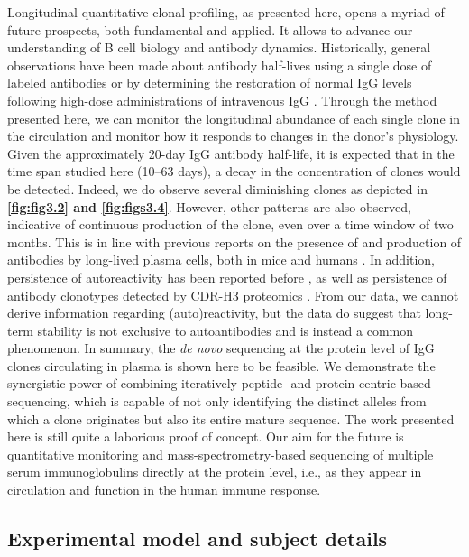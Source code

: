Longitudinal quantitative clonal profiling, as presented here, opens a myriad of future prospects, both fundamental and applied. It allows to advance our understanding of B cell biology and antibody dynamics. Historically, general observations have been made about antibody half-lives using a single dose of labeled antibodies \cite{morell1970metabolic} or by determining the restoration of normal IgG levels following high-dose administrations of intravenous IgG \cite{melamed2018pharmacokinetics}. Through the method presented here, we can monitor the longitudinal abundance of each single clone in the circulation and monitor how it responds to changes in the donor’s physiology. Given the approximately 20-day IgG antibody half-life, it is expected that in the time span studied here (10–63 days), a decay in the concentration of clones would be detected. Indeed, we do observe several diminishing clones as depicted in \textbf{\autoref{fig:fig3.2} and \autoref{fig:figs3.4}}. However, other patterns are also observed, indicative of continuous production of the clone, even over a time window of two months. This is in line with previous reports on the presence of and production of antibodies by long-lived plasma cells, both in mice and humans \cite{bernasconi2002maintenance, manz1997lifetime, slifka1998humoral}. In addition, persistence of autoreactivity has been reported before \cite{tebani2020integration}, as well as persistence of antibody clonotypes detected by CDR-H3 proteomics \cite{lee2019persistent}. From our data, we cannot derive information regarding (auto)reactivity, but the data do suggest that long-term stability is not exclusive to autoantibodies and is instead a common phenomenon.
In summary, the \emph{de novo} sequencing at the protein level of IgG clones circulating in plasma is shown here to be feasible. We demonstrate the synergistic power of combining iteratively peptide- and protein-centric-based sequencing, which is capable of not only identifying the distinct alleles from which a clone originates but also its entire mature sequence. The work presented here is still quite a laborious proof of concept. Our aim for the future is quantitative monitoring and mass-spectrometry-based sequencing of multiple serum immunoglobulins directly at the protein level, i.e., as they appear in circulation and function in the human immune response.

\subsection{Experimental model and subject details}

